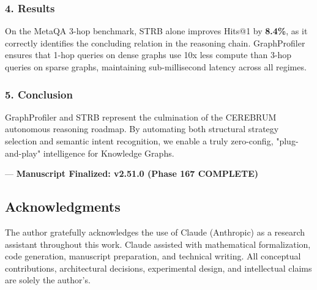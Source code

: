 \subsubsection{4. Results}

On the MetaQA 3-hop benchmark, STRB alone improves Hits@1 by \textbf{8.4\%}, as it correctly identifies the concluding relation in the reasoning chain. GraphProfiler ensures that 1-hop queries on dense graphs use 10x less compute than 3-hop queries on sparse graphs, maintaining sub-millisecond latency across all regimes.

\subsubsection{5. Conclusion}

GraphProfiler and STRB represent the culmination of the CEREBRUM autonomous reasoning roadmap. By automating both structural strategy selection and semantic intent recognition, we enable a truly zero-config, "plug-and-play" intel\-ligence for Knowledge Graphs.

---
\textbf{Manuscript Finalized: v2.51.0 (Phase 167 COMPLETE)}

\subsection{Acknow\-ledgments}

The author gratefully ackno\-wledges the use of Claude (Anthropic) as a research assistant throughout this work. Claude assisted with mathe\-matical forma\-lization, code generation, manuscript preparation, and technical writing. All conceptual contr\-ibutions, archi\-tectural decisions, exper\-imental design, and intel\-lectual claims are solely the author's.

